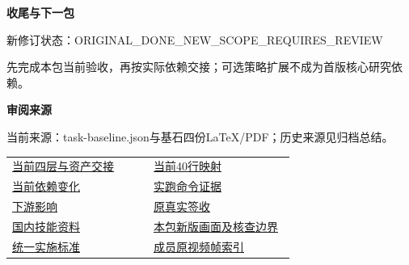 \documentclass[11pt,a4paper]{article}
\newcommand{\reviewsubsection}[1]{\par\Needspace{4\baselineskip}\vspace{4pt}\begin{center}{\titlelatin\titlecjk\bfseries\fontsize{12}{18}\selectfont #1}\end{center}}
\begin{document}
\reviewsubsection{3.3 收尾与下一包}
新修订状态：ORIGINAL\_\allowbreak{}DONE\_\allowbreak{}NEW\_\allowbreak{}SCOPE\_\allowbreak{}REQUIRES\_\allowbreak{}REVIEW


先完成本包当前验收，再按实际依赖交接；可选策略扩展不成为首版核心研究依赖。


\begin{minipage}{\linewidth}
\reviewsubsection{3.4 审阅来源}
当前来源：task-\allowbreak{}baseline.json与基石四份LaTeX/\allowbreak{}PDF；历史来源见归档总结。


\begingroup\small\setlength{\tabcolsep}{4pt}\begin{tabular}{@{}p{0.48\linewidth}p{0.48\linewidth}@{}}
\href{file:///D:/Agent/srp/agent/tasks/V-03/outputs/current-mapping.md}{当前四层与资产交接} & \href{file:///D:/Agent/srp/agent/tasks/V-03/outputs/current-mapping.json}{当前40行映射}\\[4pt]
\href{file:///D:/Agent/srp/agent/tasks/V-03/outputs/asset-drift.json}{当前依赖变化} & \href{file:///D:/Agent/srp/agent/tasks/V-03/evidence/verification.json}{实跑命令证据}\\[4pt]
\href{file:///D:/Agent/srp/agent/tasks/V-03/evidence/consumer-impact.md}{下游影响} & \href{file:///D:/Agent/srp/agent/governance/planning/2026-08-05_SRP_IJHCI_\%E5\%85\%A8\%E9\%A1\%B9\%E7\%9B\%AE1-12\%E6\%AD\%A5\%E8\%A7\%84\%E5\%88\%92\%E8\%AE\%BE\%E8\%AE\%A1\%E5\%8C\%85_v1.0/20_\%E4\%BA\%A7\%E5\%93\%81\%E4\%B8\%8E\%E5\%9C\%BA\%E6\%99\%AF\%E8\%AE\%BE\%E8\%AE\%A1/V-03_\%E5\%9B\%9B\%E5\%B1\%82\%E8\%A7\%86\%E5\%90\%AC\%E6\%98\%A0\%E5\%B0\%84\%E4\%B8\%8E\%E8\%B5\%84\%E4\%BA\%A7\%E6\%9D\%A5\%E6\%BA\%90\%E5\%9F\%BA\%E7\%BA\%BF/V-03_\%E6\%8A\%80\%E6\%9C\%AF\%E9\%AA\%8C\%E6\%94\%B6\%E8\%AE\%B0\%E5\%BD\%95_\%E5\%B7\%B2\%E7\%AD\%BE\%E7\%BD\%B2.md}{原真实签收}\\[4pt]
\href{file:///D:/Agent/srp/agent/governance/planning/2026-08-05_SRP_IJHCI_\%E5\%85\%A8\%E9\%A1\%B9\%E7\%9B\%AE1-12\%E6\%AD\%A5\%E8\%A7\%84\%E5\%88\%92\%E8\%AE\%BE\%E8\%AE\%A1\%E5\%8C\%85_v1.0/24_\%E5\%9B\%A2\%E9\%98\%9F\%E4\%BB\%BB\%E5\%8A\%A1\%E4\%B8\%8E\%E9\%A1\%B9\%E7\%9B\%AE\%E6\%B2\%BB\%E7\%90\%86/08_\%E4\%BB\%BB\%E5\%8A\%A1\%E6\%8A\%80\%E8\%83\%BD\%E4\%B8\%8E\%E5\%9B\%BD\%E5\%86\%85\%E5\%AD\%A6\%E4\%B9\%A0\%E8\%B5\%84\%E6\%96\%99_v1.0.md}{国内技能资料} & \href{file:///D:/Agent/srp/agent/tasks/V-03/outputs/current-implementation-evidence.md}{本包新版画面及核查边界}\\[4pt]
\href{file:///D:/Agent/srp/agent/design/weather/2026-10-08_Storm\%E4\%B8\%8E\%E7\%BA\%AF\%E7\%B2\%92\%E5\%AD\%90\%E5\%8F\%8C\%E7\%8E\%AF\%E5\%AE\%9E\%E6\%96\%BD\%E6\%A0\%87\%E5\%87\%86.md}{统一实施标准} & \href{file:///D:/Agent/srp/human/assets/previews/2026-10-08/member-storm-particle-rings/frame-index.json}{成员原视频帧索引}\\[4pt]

\end{tabular}
\end{minipage}
\end{document}
